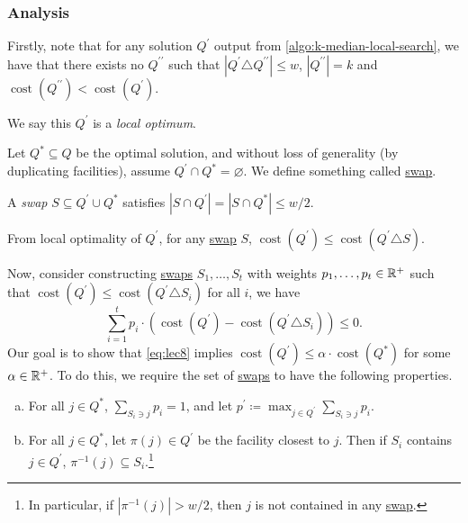 \subsubsection{Analysis}
Firstly, note that for any solution \(Q^\prime \) output from \autoref{algo:k-median-local-search}, we have that there exists no \(Q^{\prime\prime}\) such that \(\left\vert Q^\prime \triangle Q^{\prime\prime} \right\vert \leq w\), \(\left\vert Q^{\prime\prime} \right\vert = k\) and \(\mathop{\mathrm{cost}}(Q^{\prime\prime}) < \mathop{\mathrm{cost}}(Q^\prime )\).

\begin{note}
	We say this \(Q^\prime \) is a \emph{local optimum}.
\end{note}

Let \(Q^{\ast} \subseteq Q\) be the optimal solution, and without loss of generality (by duplicating facilities), assume \(Q^\prime \cap Q^{\ast} = \varnothing \). We define something called \hyperref[not:swap]{swap}.

\begin{notation}[Swap]\label{not:swap}
	A \emph{swap} \(S \subseteq Q^\prime \cup Q^{\ast} \) satisfies \(\left\vert S \cap Q^\prime  \right\vert = \left\vert S \cap Q^{\ast}  \right\vert \leq w / 2\).
\end{notation}

\begin{note}
	From local optimality of \(Q^\prime \), for any \hyperref[not:swap]{swap} \(S\), \(\mathop{\mathrm{cost}}(Q^\prime ) \leq \mathop{\mathrm{cost}}(Q^\prime \triangle S)\).
\end{note}

Now, consider constructing \hyperref[not:swap]{swaps} \(S_1, \ldots, S_t\) with weights \(p_1, \ldots , p_t \in \mathbb{\MakeUppercase{r}} ^+\) such that \(\mathop{\mathrm{cost}}(Q^\prime ) \leq \mathop{\mathrm{cost}}(Q^\prime \triangle S_i)\) for all \(i\), we have
\begin{equation}\label{eq:lec8}
	\sum_{i=1} ^t p_i \cdot (\mathop{\mathrm{cost}}(Q^\prime ) - \mathop{\mathrm{cost}}(Q^\prime \triangle S_i)) \leq 0.
\end{equation}
Our goal is to show that \autoref{eq:lec8} implies \(\mathop{\mathrm{cost}}(Q^\prime ) \leq \alpha\cdot \mathop{\mathrm{cost}}(Q^{\ast} )\) for some \(\alpha \in \mathbb{\MakeUppercase{r}} ^+\). To do this, we require the set of \hyperref[not:swap]{swaps} to have the following properties.

\begin{enumerate}[(a)]
	\item For all \(j\in Q^{\ast} \), \(\sum_{S_i \ni j}p_i = 1 \), and let \(p^\prime \coloneqq \max _{j\in Q^\prime }\sum_{S_i\ni j}p_i\).
	\item For all \(j\in Q^{\ast} \), let \(\pi (j)\in Q^\prime \) be the facility closest to \(j\). Then if \(S_i\) contains \(j\in Q^\prime \), \(\pi ^{-1} (j)\subseteq S_i\).\footnote{In particular, if \(\left\vert \pi ^{-1} (j) \right\vert > w / 2 \), then \(j\) is not contained in any \hyperref[not:swap]{swap}.}
\end{enumerate}

